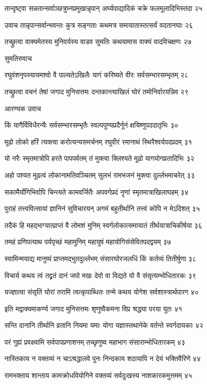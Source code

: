 तान्दृष्ट्वा सन्नतान्सर्वाञ्छत्रुघ्नप्रमुखान्नृपान्
अर्घ्यपाद्यादिकं चक्रे फलमूलादिभिस्तदा २५

उवाच तान्नृपान्सर्वान्भवन्तः कुत्र सङ्गताः
कथमत्र समायातास्तत्सर्वं वदतानघाः २६

तच्छ्रुत्वा वाक्यमेतस्य मुनिवर्यस्य वाडव
सुमतिः कथयामास वाक्यं वादविचक्षणः २७

सुमतिरुवाच

रघुवंशनृपस्यायमश्वो वै पाल्यतेऽखिलैः
यागं करिष्यते वीरः सर्वसम्भारसम्भृतम् २८

तच्छ्रुत्वा वचनं तेषां जगाद मुनिसत्तमः
दन्तकान्त्याखिलं घोरं तमोनिर्वारयन्निव २९

आरण्यक उवाच

किं यागैर्विविधैरन्यैः सर्वसम्भारसम्भृतैः
स्वल्पपुण्यप्रदैर्नूनं क्षयिष्णुपददातृभिः ३०

मूढो लोको हरिं त्यक्त्वा करोत्यन्यसमर्चनम्
रघुवीरं रमानाथं स्थिरैश्वर्यपदप्रदम् ३१

यो नरैः स्मृतमात्रोपि हरते पापपर्वतम्
तं मुक्त्वा क्लिश्यते मूढो यागयोगव्रतादिभिः ३२

अहो पश्यत मूढत्वं लोकानामतिवञ्चितम्
सुलभं रामभजनं मुक्त्वा दुर्ल्लभमाचरेत् ३३

सकामैर्योगिभिर्वापि चिन्त्यते कामवर्जितैः
अपवर्गप्रदं नॄणां स्मृतमात्राखिलाघहम् ३४

पुराहं तत्त्ववित्सायां ज्ञानिनं सुविचारयन्
अगमं बहुतीर्थानि तत्त्वं कोपि न मेऽदिशत् ३५

तदैकं हि महद्भाग्यात्प्राप्तं वै लोमशं मुनिम्
स्वर्गलोकात्समायातं तीर्थयात्राचिकीर्षया ३६

तमहं प्रणिपत्याथ पर्यपृच्छं महामुनिम्
महायुषं महायोगिसंसेवितपदद्वयम् ३७

स्वामिन्मयाद्य मानुष्यं प्राप्तमद्भुतदुर्ल्लभम्
संसारघोरजलधिं किं कर्तव्यं तितीर्षुणा ३८

विचार्य कथय त्वं तद्व्रतं दानं जपो मखः
देवो वा विद्यते यो वै संसृत्यम्भोधितारकः ३९

यज्ज्ञात्वा संसृतिं घोरां तरामि त्वत्कृपाब्धितः
तन्मे कथय योगेश सर्वशास्त्रार्थपारग ४०

इति मद्वाक्यमाकर्ण्य जगाद मुनिसत्तमः
शृणुष्वैकमना विप्र श्रद्धया परया युतः ४१

सन्ति दानानि तीर्थानि व्रतानि नियमा यमाः
योगा यज्ञास्तथानेके वर्तन्ते स्वर्गदायकाः ४२

परं गुह्यं प्रवक्ष्यामि सर्वपापप्रणाशनम्
तच्छृणुष्व महाभाग संसाराम्भोधितारकम् ४३

नास्तिकाय न वक्तव्यं न चाऽश्रद्धालवे पुनः
निन्दकाय शठायापि न देयं भक्तिवैरिणे ४४

रामभक्ताय शान्ताय कामक्रोधवियोगिने
वक्तव्यं सर्वदुःखस्य नाशकारकमुत्तमम् ४५

